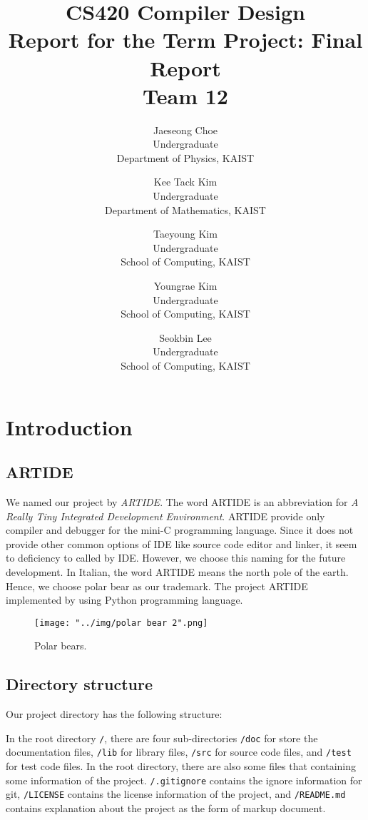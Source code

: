 \documentclass{article}
\title
{
	CS420 Compiler Design\\
	Report for the Term Project: Final Report\\
	${}$\\
	Team 12
}
\author
{
	Jaeseong Choe\\
	Undergraduate\\
	Department of Physics, KAIST
	\and
	Kee Tack Kim\\
	Undergraduate\\
	Department of Mathematics, KAIST
	\and
	Taeyoung Kim\\
	Undergraduate\\
	School of Computing, KAIST
	\and
	Youngrae Kim\\
	Undergraduate\\
	School of Computing, KAIST
	\and
	Seokbin Lee\\
	Undergraduate\\
	School of Computing, KAIST
}
\newcommand{\code}[1]{\texttt{#1}}
\begin{document}
	\maketitle
	
	\section{Introduction}
	
	\subsection{ARTIDE}
	
	We named our project by \emph{ARTIDE}. The word ARTIDE is an abbreviation for \emph{A Really Tiny Integrated Development Environment}. ARTIDE provide only compiler and debugger for the mini-C programming language. Since it does not provide other common options of IDE like source code editor and linker, it seem to deficiency to called by IDE. However, we choose this naming for the future development. In Italian, the word ARTIDE means the north pole of the earth. Hence, we choose polar bear as our trademark. The project ARTIDE implemented by using Python programming language.
	
	\begin{figure}
		\centering
		\texttt{[image: "../img/polar bear 2".png]}
		\caption{Polar bears.}
		\label{fig: polar bears}
	\end{figure}
	
	\subsection{Directory structure}
	
	Our project directory has the following structure:
	
	In the root directory \code{/}, there are four sub-directories \code{/doc} for store the documentation files, \code{/lib} for library files, \code{/src} for source code files, and \code{/test} for test code files. In the root directory, there are also some files that containing some information of the project. \code{/.gitignore} contains the ignore information for git, \code{/LICENSE} contains the license information of the project, and \code{/README.md} contains explanation about the project as the form of markup document.
	
\end{document}
